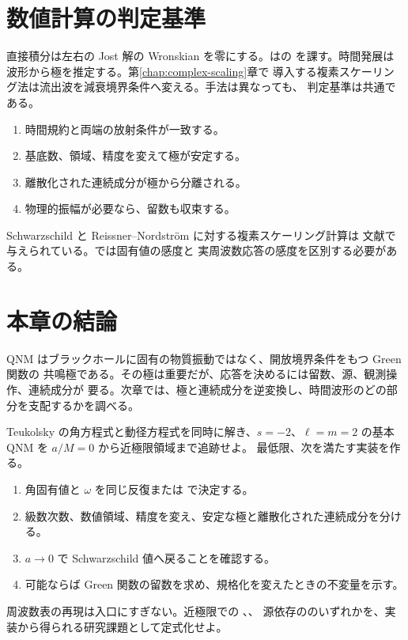 \section{数値計算の判定基準}

直接積分は左右の Jost 解の Wronskian を零にする。はの
を課す。時間発展は波形から極を推定する。第\ref{chap:complex-scaling}章で
導入する複素スケーリング法は流出波を減衰境界条件へ変える。手法は異なっても、
判定基準は共通である。

\begin{enumerate}[label=(\roman*),leftmargin=2.8em]
\item 時間規約と両端の放射条件が一致する。
\item 基底数、領域、精度を変えて極が安定する。
\item 離散化された連続成分が極から分離される。
\item 物理的振幅が必要なら、留数も収束する。
\end{enumerate}

Schwarzschild と Reissner--Nordstr\"om に対する複素スケーリング計算は
文献\cite{Ogawa:2026veu}で与えられている。では固有値の感度と
実周波数応答の感度を区別する必要がある\cite{Jaramillo:2020tuu}。

\section{本章の結論}

QNM はブラックホールに固有の物質振動ではなく、開放境界条件をもつ Green 関数の
共鳴極である。その極は重要だが、応答を決めるには留数、源、観測操作、連続成分が
要る。次章では、極と連続成分を逆変換し、時間波形のどの部分を支配するかを調べる。

\begin{researchproblem}
Teukolsky の角方程式と動径方程式を同時に解き、$s=-2$、$\ell=m=2$ の基本 QNM を
$a/M=0$ から近極限領域まで追跡せよ\cite{Teukolsky:1972my,Leaver:1985ax}。
最低限、次を満たす実装を作る。

\begin{enumerate}[label=(\roman*),leftmargin=2.8em]
\item 角固有値と $\omega$ を同じ反復または で決定する。
\item 級数次数、数値領域、精度を変え、安定な極と離散化された連続成分を分ける。
\item $a\to0$ で Schwarzschild 値へ戻ることを確認する。
\item 可能ならば Green 関数の留数を求め、規格化を変えたときの不変量を示す。
\end{enumerate}

周波数表の再現は入口にすぎない。近極限での 、、
源依存ののいずれかを、実装から得られる研究課題として定式化せよ。
\end{researchproblem}
